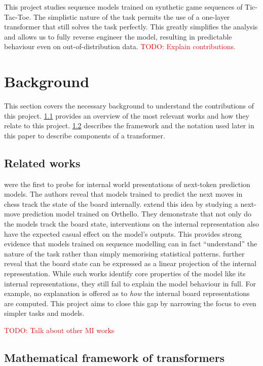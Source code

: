 \documentclass{article}
\newcommand{\todo}[1]{\textcolor{red}{TODO: #1}}
\newcommand{\ttt}{Tic-Tac-Toe\xspace}
\begin{document}
This project studies sequence models trained on synthetic game sequences of \ttt. The simplistic nature of the task permits the use of a one-layer transformer that still solves the task perfectly. This greatly simplifies the analysis and allows us to fully reverse engineer the model, resulting in predictable behaviour even on out-of-distribution data. \todo{Explain contributions.}

\section{Background}

This section covers the necessary background to understand the contributions of this project. \cref{sec:related} provides an overview of the most relevant works and how they relate to this project. \cref{sec:math} describes the framework and the notation used later in this paper to describe components of a transformer.

\subsection{Related works} \label{sec:related}

\citet{toshniwal2021learning} were the first to probe for internal world presentations of next-token prediction models. The authors reveal that models trained to predict the next moves in chess track the state of the board internally. \citet{orthello-gpt} extend this idea by studying a next-move prediction model trained on Orthello. They demonstrate that not only do the models track the board state, interventions on the internal representation also have the expected casual effect on the model's outputs. This provides strong evidence that models trained on sequence modelling can in fact ``understand'' the nature of the task rather than simply memorising statistical patterns. \citet{linear-orthello-gpt} further reveal that the board state can be expressed as a linear projection of the internal representation. While such works identify core properties of the model like its internal representations, they still fail to explain the model behaviour in full. For example, no explanation is offered as to \emph{how} the internal board representations are computed. This project aims to close this gap by narrowing the focus to even simpler tasks and models.

\todo{Talk about other MI works}

\subsection{Mathematical framework of transformers} \label{sec:math}
\end{document}
